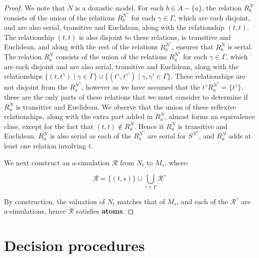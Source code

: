 \begin{proof}
We note that $N$ is a doxastic model. For each $b \in A - \{a\}$, the relation
$R^N_b$ consists of the union of the relations $R^{N^\gamma}_b$ for each $\gamma
\in \Gamma$, which are each disjoint, and are also serial, transitive and
Euclidean, along with the relationship $(t, t)$. The relationship $(t,t)$ is
also disjoint to these relations, is transitive and Euclidean, and along with
the rest of the relations $R^{N^\gamma}_b$, ensures that $R^N_b$ is serial. The
relation $R^N_a$ consists of the union of the relations $R^{N^\gamma}_a$ for
each $\gamma \in \Gamma$, which are each disjoint and are also serial,
transitive and Euclidean, along with the relationships $\{(t, t^\gamma) \mid
\gamma \in \Gamma\} \cup \{(t^\gamma, t^{\gamma'}) \mid \gamma, \gamma' \in
\Gamma\}$. These relationships are not disjoint from the $R^{N^\gamma}_a$,
however as we have assumed that the $t^\gamma R^{N^\gamma}_a = \{t^\gamma\}$,
these are the only parts of these relations that we must consider to determine
if $R^N_a$ is transitive and Euclidean. We observe that the union of these
reflexive relationships, along with the extra part added in $R^N_a$, almost
forms an equivalence class, except for the fact that $(t, t) \notin R^N_a$.
Hence it $R^N_a$ is transitive and Euclidean. $R^N_a$ is also serial as each of
the $R^{N^\gamma}_a$ are serial for $S^{N^\gamma}$, and $R^N_a$ adds at least
one relation involving $t$.

We next construct an $a$-simulation $\mathcal{R}$ from $N_t$ to $M_s$,
where:

$$\mathcal{R} = \{(t, s)\} \cup \bigcup_{\gamma \in \Gamma} \mathcal{R}^\gamma$$

By construction, the valuation of $N_t$ matches that of $M_s$, and each of the
$\mathcal{R}^\gamma$ are $a$-simulations, hence $\mathcal{R}$ satisfies {\bf
atoms}.

\end{proof}

\section{Decision procedures}
